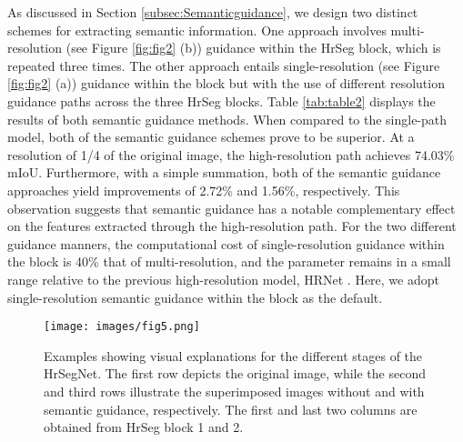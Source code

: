 \documentclass[preprint,12pt,authoryear]{elsarticle}
\begin{document}
As discussed in Section \ref{subsec:Semanticguidance}, we design two distinct schemes for extracting semantic information. One approach involves multi-resolution (see Figure \ref{fig:fig2} (b)) guidance within the HrSeg block, which is repeated three times. The other approach entails single-resolution (see Figure \ref{fig:fig2} (a)) guidance within the block but with the use of different resolution guidance paths across the three HrSeg blocks. Table \ref{tab:table2} displays the results of both semantic guidance methods. When compared to the single-path model, both of the semantic guidance schemes prove to be superior. At a resolution of 1/4 of the original image, the high-resolution path achieves 74.03\% mIoU. Furthermore, with a simple summation, both of the semantic guidance approaches yield improvements of 2.72\% and 1.56\%, respectively. This observation suggests that semantic guidance has a notable complementary effect on the features extracted through the high-resolution path. For the two different guidance manners, the computational cost of single-resolution guidance within the block is 40\% that of multi-resolution, and the parameter remains in a small range relative to the previous high-resolution model, HRNet \citep{wang_deep_2020}. Here, we adopt single-resolution semantic guidance within the block as the default.

\begin{center}
    \begin{figure}
        \centering
        \texttt{[image: images/fig5.png]}
        \caption{Examples showing visual explanations for the different stages of the HrSegNet. The first row depicts the original image, while the second and third rows illustrate the superimposed images without and with semantic guidance, respectively. The first and last two columns are obtained from HrSeg block 1 and 2.}
        \label{fig:fig5}
    \end{figure}
\end{center}
\end{document}
